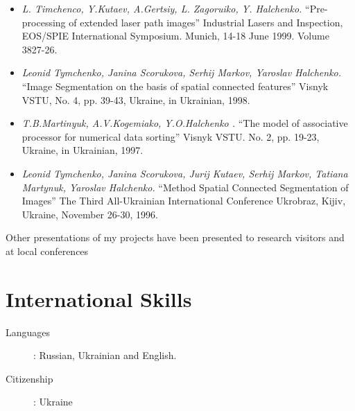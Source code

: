 \documentclass[10pt,overlapped,line]{res}
\newcommand{\mtitle}[1]{``#1''}
\newcommand{\mauthors}[1]{ \textit{#1.}}
\newcommand{\mwhere}[1]{#1.}
\begin{document}
\begin{resume}
\begin{itemize}
  \item 
    \mauthors{L. Timchenco, Y.Kutaev, A.Gertsiy, L. Zagoruiko, Y. Halchenko} 
    \mtitle{Pre-processing of extended laser path images} 
    \mwhere{Industrial Lasers and Inspection, EOS/SPIE International Symposium. Munich, 14-18 June 1999. Volume 3827-26}

  \item 
    \mauthors{Leonid Tymchenko, Janina Scorukova, Serhij Markov, Yaroslav Halchenko} 
    \mtitle{Image Segmentation on the basis of spatial connected features} 
    \mwhere{Visnyk VSTU, No. 4, pp. 39-43, Ukraine, in Ukrainian, 1998}

  \item 
    \mauthors{T.B.Martinyuk, A.V.Kogemiako, Y.O.Halchenko } 
    \mtitle{The model of associative processor for numerical data sorting} 
    \mwhere{ Visnyk VSTU. No. 2, pp. 19-23, Ukraine, in Ukrainian, 1997}

  \item 
    \mauthors{Leonid Tymchenko, Janina Scorukova, Jurij Kutaev, Serhij Markov, Tatiana Martynuk, Yaroslav Halchenko} 
    \mtitle{Method Spatial Connected Segmentation of Images}
    \mwhere{The Third All-Ukrainian International Conference Ukrobraz, Kijiv, Ukraine, November 26-30, 1996}
\end{itemize}

Other presentations of my projects have been presented to research visitors and at local conferences

\section{International Skills}
 \begin{description}
 \item[Languages]: Russian, Ukrainian and English. 
 \item[Citizenship]: Ukraine
 \end{description}

\end{resume}
\end{document}
